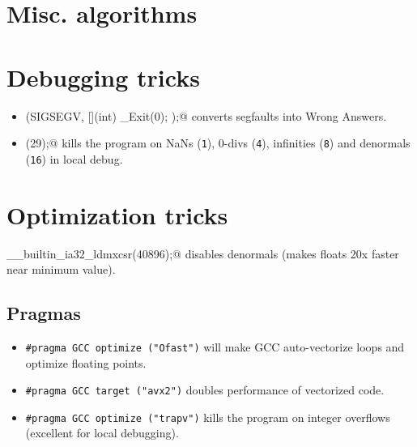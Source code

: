 \section{Misc. algorithms}

\section{Debugging tricks}
	\begin{itemize}
		\item \verb@signal(SIGSEGV, [](int) { _Exit(0); });@ converts segfaults into Wrong Answers.
		\item \verb@feenableexcept(29);@ kills the program on NaNs (\texttt 1), 0-divs (\texttt 4), infinities (\texttt 8) and denormals (\texttt{16}) in local debug.
	\end{itemize}

\section{Optimization tricks}
	\verb@__builtin_ia32_ldmxcsr(40896);@ disables denormals (makes floats 20x faster near minimum value).
	
	
	\subsection{Pragmas}
		\begin{itemize}
			\item \lstinline{#pragma GCC optimize ("Ofast")} will make GCC auto-vectorize loops and optimize floating points.
			\item \lstinline{#pragma GCC target ("avx2")} doubles performance of vectorized code.
			\item \lstinline{#pragma GCC optimize ("trapv")} kills the program on integer overflows (excellent for local debugging).
		\end{itemize}